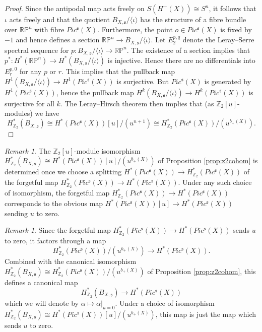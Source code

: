 \documentclass{amsart}
\theoremstyle{definition}
\theoremstyle{remark}
\newtheorem{remark}[theorem]{Remark}
\numberwithin{equation}{section}
\begin{document}
\begin{proof}
Since the antipodal map acts freely on $S(H^+(X)) \cong S^n$, it follows that $\iota$ acts freely and that the quotient $B_{X,\mathfrak{s}}/\langle \iota \rangle$ has the structure of a fibre bundle over $\mathbb{RP}^n$ with fibre $Pic^{\mathfrak{s}}(X)$. Furthermore, the point $o \in Pic^{\mathfrak{s}}(X)$ is fixed by $-1$ and hence defines a section $\mathbb{RP}^n \to B_{X,\mathfrak{s}}/\langle \iota \rangle$. Let $E_2^{p,q}$ denote the Leray--Serre spectral sequence for $p : B_{X,\mathfrak{s}}/\langle \iota \rangle \to \mathbb{RP}^n$. The existence of a section implies that $p^* : H^*(\mathbb{RP}^n) \to H^*( B_{X,\mathfrak{s}}/\langle \iota \rangle )$ is injective. Hence there are no differentials into $E_r^{p,0}$ for any $p$ or $r$. This implies that the pullback map $H^1( B_{X,\mathfrak{s}}/\langle \iota \rangle ) \to H^1( Pic^{\mathfrak{s}}(X))$ is surjective. But $Pic^{\mathfrak{s}}(X)$ is generated by $H^1( Pic^{\mathfrak{s}}(X))$, hence the pullback map $H^k( B_{X,\mathfrak{s}}/\langle \iota \rangle ) \to H^k( Pic^{\mathfrak{s}}(X))$ is surjective for all $k$. The Leray--Hirsch theorem then implies that (as $\mathbb{Z}_2[u]$-modules) we have 
\[
H^*_{\mathbb{Z}_2}( B_{X , \mathfrak{s}}) \cong H^*( Pic^{\mathfrak{s}}(X) )[u]/(u^{n+1}) \cong H^*_{\mathbb{Z}_2}(Pic^{\mathfrak{s}}(X))/(u^{b_+(X)}).
\]
\end{proof}

\begin{remark}
The $\mathbb{Z}_2[u]$-module isomorphism $H^*_{\mathbb{Z}_2}( B_{X,\mathfrak{s}}) \cong H^*( Pic^{\mathfrak{s}}(X) )[u]/(u^{b_+(X)})$ of Proposition \ref{prop:z2cohom} is determined once we choose a splitting $H^*( Pic^{\mathfrak{s}}(X) ) \to H^*_{\mathbb{Z}_2}( Pic^{\mathfrak{s}}(X))$ of the forgetful map $H^*_{\mathbb{Z}_2}( Pic^{\mathfrak{s}}(X) ) \to H^*( Pic^{\mathfrak{s}}(X))$. Under any such choice of isomorphism, the forgetful map $H^*_{\mathbb{Z}_2}( Pic^{\mathfrak{s}}(X) ) \to H^*( Pic^{\mathfrak{s}}(X))$ corresponds to the obvious map $H^*(Pic^{\mathfrak{s}}(X) )[u] \to H^*(Pic^{\mathfrak{s}}(X))$ sending $u$ to zero.
\end{remark}

\begin{remark}\label{rem:u0}
Since the forgetful map $H^*_{\mathbb{Z}_2}( Pic^{\mathfrak{s}}(X) ) \to H^*( Pic^{\mathfrak{s}}(X))$ sends $u$ to zero, it factors through a map
\[
H^*_{\mathbb{Z}_2}( Pic^{\mathfrak{s}}(X) )/(u^{b_+(X)}) \to H^*(Pic^{\mathfrak{s}}(X) ).
\]
Combined with the canonical isomorphism $H^*_{\mathbb{Z}_2}( B_{X,\mathfrak{s}} ) \cong H^*_{\mathbb{Z}_2}( Pic^{\mathfrak{s}}(X) )/(u^{b_+(X)})$ of Proposition \ref{prop:z2cohom}, this defines a canonical map
\[
H^*_{\mathbb{Z}_2}( B_{X,\mathfrak{s}} ) \to H^*(Pic^{\mathfrak{s}}(X))
\]
which we will denote by $\alpha \mapsto \alpha|_{u=0}$. Under a choice of isomorphism $H^*_{\mathbb{Z}_2}(B_{X,\mathfrak{s}}) \cong H^*( Pic^{\mathfrak{s}}(X) )[u]/(u^{b_+(X)})$, this map is just the map which sends $u$ to zero.
\end{remark}
\end{document}
